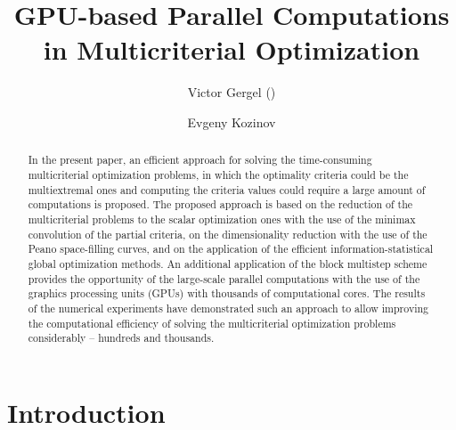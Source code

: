 \documentclass[runningheads]{llncs}
\begin{document}
\title{GPU-based Parallel Computations in Multicriterial Optimization 
}

\author{ Victor Gergel (\Envelope) \and
Evgeny Kozinov }




\maketitle

\begin{abstract}
In the present paper, an efficient approach for solving the time-consuming multicriterial optimization problems, in which the optimality criteria could be the multiextremal ones and computing the criteria values could require a large amount of computations is proposed. The proposed approach is based on the reduction of the multicriterial problems to the scalar optimization ones with the use of the minimax convolution of the partial criteria, on the dimensionality reduction with the use of the Peano space-filling curves, and on the application of the efficient information-statistical global optimization methods. An additional application of the block multistep scheme provides the opportunity of the large-scale parallel computations with the use of the graphics processing units (GPUs) with thousands of computational cores. The results of the numerical experiments have demonstrated such an approach to allow improving the computational efficiency of solving the multicriterial optimization problems considerably -- hundreds and thousands.
\end{abstract}


\section{Introduction} \label{sec:01}
\end{document}
